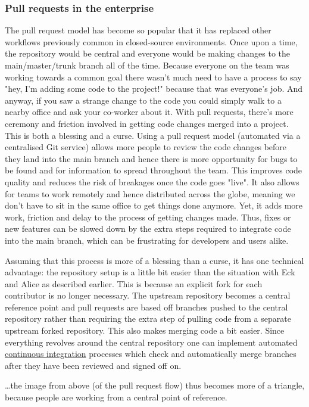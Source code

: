 \documentclass{git_course}
\begin{document}
\begin{frame}
    \frametitle{Pull requests in the enterprise}

The pull request model has become so popular that it has replaced other
workflows previously common in closed-source environments.  Once upon a
time, the repository would be central and everyone would be making changes
to the main/master/trunk branch all of the time.  Because everyone on
the team was working towards a common goal there wasn't much need to have a
process to say "hey, I'm adding some code to the project!" because that was
everyone's job.  And anyway, if you saw a strange change to the code you
could simply walk to a nearby office and ask your co-worker about it.  With
pull requests, there's more ceremony and friction involved in getting code
changes merged into a project.  This is both a blessing and a curse.  Using
a pull request model (automated via a centralised Git service) allows more
people to review the code changes before they land into the main branch and
hence there is more opportunity for bugs to be found and for information to
spread throughout the team.  This improves code quality and reduces the risk
of breakages once the code goes "live".  It also allows for teams to work
remotely and hence distributed across the globe, meaning we don't have to
sit in the same office to get things done anymore.  Yet, it adds more work,
friction and delay to the process of getting changes made.  Thus, fixes or
new features can be slowed down by the extra steps required to integrate
code into the main branch, which can be frustrating for developers and users
alike.

Assuming that this process is more of a blessing than a curse, it has one
technical advantage: the repository setup is a little bit easier than the
situation with Eck and Alice as described earlier.  This is because an
explicit fork for each contributor is no longer necessary.  The upstream
repository becomes a central reference point and pull requests are based off
branches pushed to the central repository rather than requiring the extra
step of pulling code from a separate upstream forked repository.  This also
makes merging code a bit easier.  Since everything revolves around the
central repository one can implement automated
\href{https://en.wikipedia.org/wiki/Continuous_integration}{continuous
integration} processes
which check and automatically merge branches after they have been reviewed
and signed off on.

\ldots the image from above (of the pull request flow) thus becomes more of a
triangle, because people are working from a central point of reference.
\end{frame}
\end{document}
